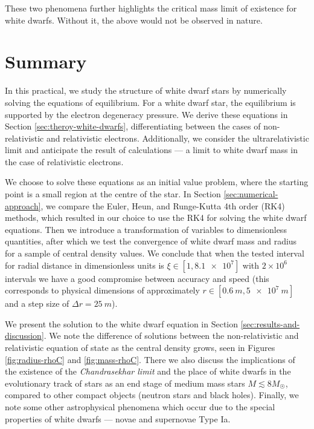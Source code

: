 \documentclass[]{article}
\begin{document}
	These two phenomena further highlights the critical mass limit of existence for white dwarfs. Without it, the above would not be observed in nature.

\section{Summary}\label{sec:summary}
	In this practical, we study the structure of white dwarf stars by numerically solving the equations of equilibrium. For a white dwarf star, the equilibrium is supported by the electron degeneracy pressure. We derive these equations in Section \ref{sec:theroy-white-dwarfs}, differentiating between the cases of non-relativistic and relativistic electrons. Additionally, we consider the ultrarelativistic limit and anticipate the result of calculations --- a limit to white dwarf mass in the case of relativistic electrons.
	
	We choose to solve these equations as an initial value problem, where the starting point is a small region at the centre of the star. In Section \ref{sec:numerical-approach}, we compare the Euler, Heun, and Runge-Kutta 4th order (RK4) methods, which resulted in our choice to use the RK4 for solving the white dwarf equations. Then we introduce a transformation of variables to dimensionless quantities, after which we test the convergence of white dwarf mass and radius for a sample of central density values. We conclude that when the tested interval for radial distance in dimensionless units is $\xi \in \left[ 1, \num{8.1e7}\right]$ with $2 \times 10^6$ intervals we have a good compromise between accuracy and speed (this corresponds to physical dimensions of approximately $r \in \left[\SI{0.6}{m}, \SI{5e7}{m}\right]$ and a step size of $\Delta r = \SI{25}{m}$).

	We present the solution to the white dwarf equation in Section \ref{sec:results-and-discussion}. We note the difference of solutions between the non-relativistic and relativistic equation of state as the central density grows, seen in Figures \ref{fig:radius-rhoC} and \ref{fig:mass-rhoC}. There we also discuss the implications of the existence of the \emph{Chandrasekhar limit} and the place of white dwarfs in the evolutionary track of stars as an end stage of medium mass stars $M \lesssim 8 M_{\astrosun}$, compared to other compact objects (neutron stars and black holes). Finally, we note some other astrophysical phenomena which occur due to the special properties of white dwarfs --- novae and supernovae Type Ia.
\end{document}
